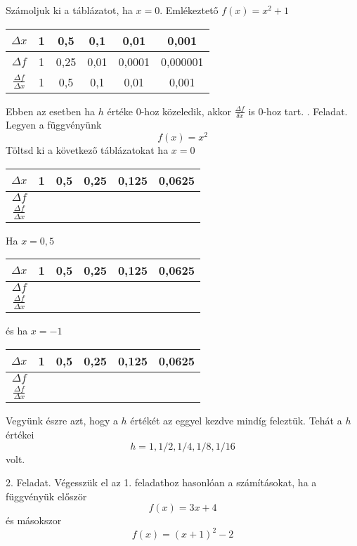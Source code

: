 \documentclass[11pt, a4paper]{article}
\begin{document}
Sz\'amoljuk ki a t\'abl\'azatot, ha $x=0$. Eml\'ekeztet\H{o} $f(x) = x^2+1$
\begin{center}
\begin{tabular}{ c|c|c|c|c|c } 
    $\Delta x$                  & 1 & 0,5   & 0,1  & 0,01   & 0,001 \\ 
 \hline
    $\Delta f$                  & 1 & 0,25  & 0,01 & 0,0001 & 0,000001 \\
 \hline
  $\frac{\Delta f}{\Delta x}$ & 1 & 0,5   & 0,1  & 0,01   & 0,001 \\
\end{tabular}
\end{center}
Ebben az esetben ha $h$ \'ert\'eke $0$-hoz közeledik, akkor $\frac{\Delta f}{\delta x}$ is $0$-hoz tart.
. Feladat. Legyen a függv\'enyünk
\[
    f(x) = x^2
\]
Töltsd ki a következ\H{o} t\'abl\'azatokat ha $x=0$
\begin{center}
\begin{tabular}{ c|c|c|c|c|c } 
    $\Delta x$                  & 1 & 0,5   & 0,25 & 0,125  & 0,0625 \\ 
 \hline
    $\Delta f$                  &   &       &      &        &        \\
 \hline
  $\frac{\Delta f}{\Delta x}$ &   &       &      &        &        \\
\end{tabular}
\end{center}
Ha $x=0,5$ 
\begin{center}
\begin{tabular}{ c|c|c|c|c|c } 
$\Delta x$                  & 1 & 0,5   & 0,25 & 0,125  & 0,0625 \\ 
\hline
$\Delta f$                  &   &       &      &        &        \\
\hline
$\frac{\Delta f}{\Delta x}$ &   &       &      &        &        \\
\end{tabular}
\end{center}
\'es ha $x=-1$
\begin{center}
\begin{tabular}{ c|c|c|c|c|c } 
$\Delta x$                  & 1 & 0,5   & 0,25 & 0,125  & 0,0625 \\ 
\hline
$\Delta f$                  &   &       &      &        &        \\
\hline
$\frac{\Delta f}{\Delta x}$ &   &       &      &        &        \\
\end{tabular}
\end{center}
Vegyünk \'eszre azt, hogy a $h$ \'ert\'ek\'et az eggyel kezdve mind\'ig feleztük. Teh\'at a $h$ \'ert\'ekei
\[
h = 1, 1/2, 1/4, 1/8, 1/16
\]
volt.

2. Feladat. V\'egesszük el az 1. feladathoz hasonl\'oan a sz\'am\'it\'asokat, ha
a függv\'enyük el\H{o}ször
\[
    f(x) = 3x+4
\]
\'es m\'asokszor
\[
    f(x) = (x+1)^2-2
\]
\end{document}
